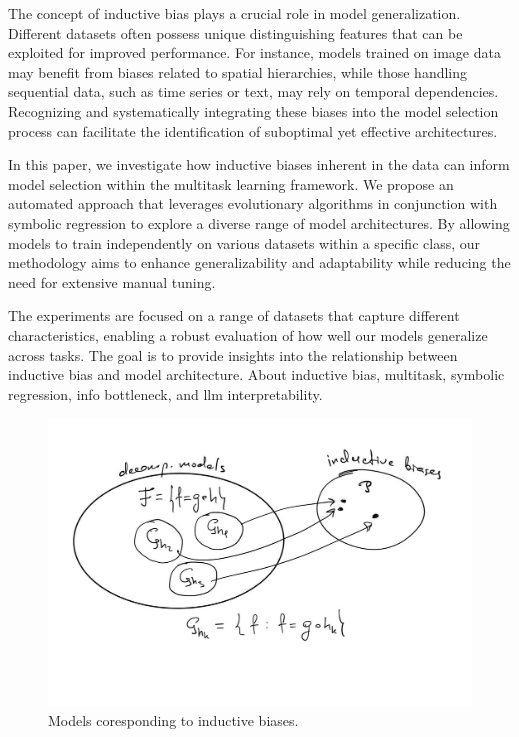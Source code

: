 \documentclass{article}
\begin{document}
The concept of inductive bias plays a crucial role in model generalization. Different datasets often possess unique distinguishing features that can be exploited for improved performance. For instance, models trained on image data may benefit from biases related to spatial hierarchies, while those handling sequential data, such as time series or text, may rely on temporal dependencies. Recognizing and systematically integrating these biases into the model selection process can facilitate the identification of suboptimal yet effective architectures.

In this paper, we investigate how inductive biases inherent in the data can inform model selection within the multitask learning framework. We propose an automated approach that leverages evolutionary algorithms in conjunction with symbolic regression to explore a diverse range of model architectures. By allowing models to train independently on various datasets within a specific class, our methodology aims to enhance generalizability and adaptability while reducing the need for extensive manual tuning.

The experiments are focused on a range of datasets that capture different characteristics, enabling a robust evaluation of how well our models generalize across tasks. The goal is to provide insights into the relationship between inductive bias and model architecture.
\citep{Cranmer2023InterpretableML}
\newline 
About inductive bias, multitask, symbolic regression, info bottleneck, and llm interpretability. 
\newline
    
\begin{figure}[hbt!]
    \centering
    \includegraphics[width=1\textwidth]{sets.jpg}
    \caption{Models coresponding to inductive biases.}
    \label{pipeline}
\end{figure}
\end{document}
